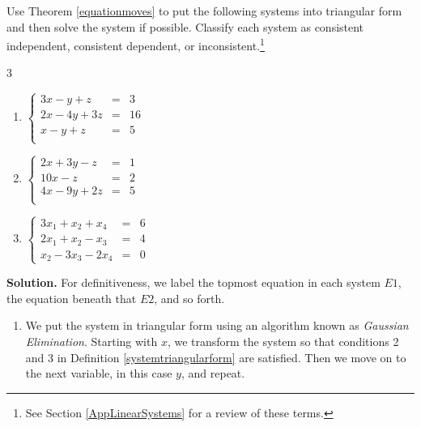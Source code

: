 \documentclass{ximera}
\begin{document}
\begin{example} \label{GaussEqnEx} Use Theorem \ref{equationmoves} to put the following systems into triangular form and then solve the system if possible.  Classify each system as consistent independent, consistent dependent, or inconsistent.\footnote{See Section \ref{AppLinearSystems} for a review of these terms.}

\begin{multicols}{3}

\begin{enumerate}

\item  $\left\{ \begin{array}{rcr} 3x-y+z & = & 3 \\ 2x-4y+3z & = & 16 \\ x-y+z & = & 5 \\ \end{array} \right.$

\item  $\left\{ \begin{array}{rcr} 2x+3y-z & = & 1 \\ 10x-z & = & 2 \\ 4x-9y+2z & = & 5 \\ \end{array} \right.$

\item  $\left\{ \begin{array}{rcr} 3x_1 +x_2 + x_4 & = & 6 \\ 2x_1 + x_2 -x_3  & = & 4  \\  x_2 -3x_3 -2x_4 & = & 0 \end{array} \right.$

\end{enumerate}

\end{multicols}

{\bf Solution.}  For definitiveness, we label the topmost equation in each system $E1$, the equation beneath that $E2$, and so forth. 

\begin{enumerate}

\item We put the system in triangular form using an algorithm known as  \textit{Gaussian Elimination}.  Starting with $x$, we transform the system so that conditions 2 and 3 in Definition \ref{systemtriangularform} are satisfied.  Then we move on to the next variable, in this case $y$, and repeat.  


\end{enumerate}
\end{example}
\end{document}

